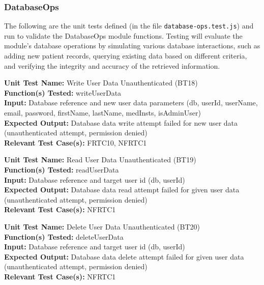 \documentclass[12pt, titlepage]{article}
\begin{document}
\subsubsection{DatabaseOps}
The following are the unit tests defined (in the file \texttt{database-ops.test.js}) and run to validate the DatabaseOps module functions. Testing will evaluate the module's database operations by simulating various database interactions, such as adding new patient records, querying existing data based on different criteria, and verifying the integrity and accuracy of the retrieved information.

\begin{mdframed}[linewidth=0.5mm]
  \textbf{Unit Test Name:} Write User Data Unauthenticated (BT18) \\
  \textbf{Function(s) Tested:} writeUserData \\
  \textbf{Input:} Database reference and new user data parameters (db, userId, userName, email, password, firstName, lastName, medInsts, isAdminUser) \\
  \textbf{Expected Output:} Database data write attempt failed for new user data (unauthenticated attempt, permission denied) \\
  \textbf{Relevant Test Case(s):} FRTC10, NFRTC1
\end{mdframed}

\begin{mdframed}[linewidth=0.5mm]
  \textbf{Unit Test Name:} Read User Data Unauthenticated (BT19) \\
  \textbf{Function(s) Tested:} readUserData \\
  \textbf{Input:} Database reference and target user id (db, userId) \\
  \textbf{Expected Output:} Database data read attempt failed for given user data (unauthenticated attempt, permission denied) \\
  \textbf{Relevant Test Case(s):} NFRTC1
\end{mdframed}

\begin{mdframed}[linewidth=0.5mm]
  \textbf{Unit Test Name:} Delete User Data Unauthenticated (BT20) \\
  \textbf{Function(s) Tested:} deleteUserData \\
  \textbf{Input:} Database reference and target user id (db, userId) \\
  \textbf{Expected Output:} Database data delete attempt failed for given user data (unauthenticated attempt, permission denied) \\
  \textbf{Relevant Test Case(s):} NFRTC1
\end{mdframed}
\end{document}
